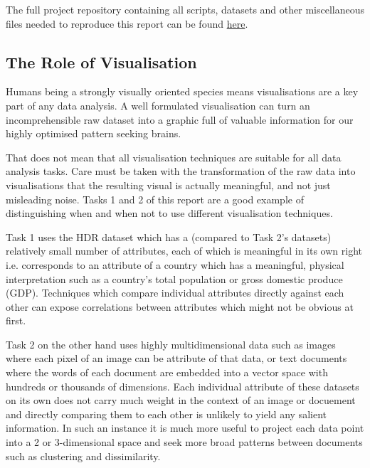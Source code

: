 \documentclass[11pt,a4paper,final]{article}
\begin{document}
The full project repository containing all scripts, datasets and other miscellaneous files needed to reproduce this report can be found \href{https://github.com/jackoc1/CS3205HumanDevelopmentReports}{here}.

\subsection{The Role of Visualisation}
Humans being a strongly visually oriented species means visualisations are a key part of any data analysis. A well formulated visualisation can turn an incomprehensible raw dataset into a graphic full of valuable information for our highly optimised pattern seeking brains.

That does not mean that all visualisation techniques are suitable for all data analysis tasks. Care must be taken with the transformation of the raw data into visualisations that the resulting visual is actually meaningful, and not just misleading noise. Tasks 1 and 2 of this report are a good example of distinguishing when and when not to use different visualisation techniques.

Task 1 uses the HDR dataset which has a (compared to Task 2's datasets) relatively small number of attributes, each of which is meaningful in its own right i.e. corresponds to an attribute of a country which has a meaningful, physical interpretation such as a country's total population or gross domestic produce (GDP). Techniques which compare individual attributes directly against each other can expose correlations between attributes which might not be obvious at first.

Task 2 on the other hand uses highly multidimensional data such as images where each pixel of an image can be attribute of that data, or text documents where the words of each document are embedded into a vector space with hundreds or thousands of dimensions. Each individual attribute of these datasets on its own does not carry much weight in the context of an image or docuement and directly comparing them to each other is unlikely to yield any salient information. In such an instance it is much more useful to project each data point into a 2 or 3-dimensional space and seek more broad patterns between documents such as clustering and dissimilarity.
\end{document}
